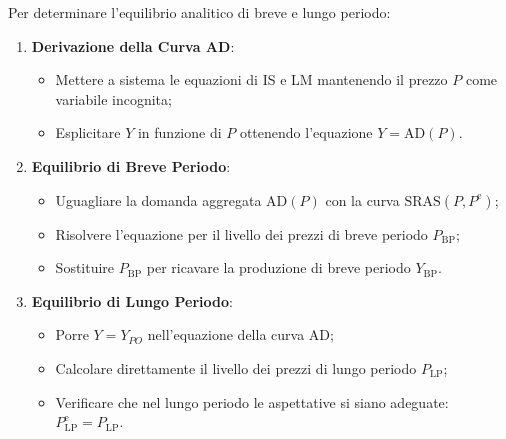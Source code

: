 \begin{metodo}
Per determinare l'equilibrio analitico di breve e lungo periodo:
\begin{enumerate}
    \item \textbf{Derivazione della Curva AD}:
    \begin{itemize}
        \item Mettere a sistema le equazioni di IS e LM mantenendo il prezzo $P$ come variabile incognita;
        \item Esplicitare $Y$ in funzione di $P$ ottenendo l'equazione $Y = \mathrm{AD}(P)$.
    \end{itemize}
    \item \textbf{Equilibrio di Breve Periodo}:
    \begin{itemize}
        \item Uguagliare la domanda aggregata $\mathrm{AD}(P)$ con la curva $\mathrm{SRAS}(P, P^{\mathrm{e}})$;
        \item Risolvere l'equazione per il livello dei prezzi di breve periodo $P_{\text{BP}}$;
        \item Sostituire $P_{\text{BP}}$ per ricavare la produzione di breve periodo $Y_{\text{BP}}$.
    \end{itemize}
    \item \textbf{Equilibrio di Lungo Periodo}:
    \begin{itemize}
        \item Porre $Y = Y_{PO}$ nell'equazione della curva AD;
        \item Calcolare direttamente il livello dei prezzi di lungo periodo $P_{\text{LP}}$;
        \item Verificare che nel lungo periodo le aspettative si siano adeguate: $P_{\text{LP}}^{\mathrm{e}} = P_{\text{LP}}$.
    \end{itemize}
\end{enumerate}
\end{metodo}

